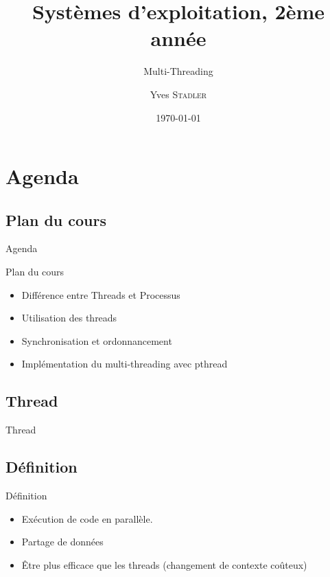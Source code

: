 
\title{Systèmes d'exploitation, 2ème année}
\subtitle{Multi-Threading}

\author{Yves \textsc{Stadler}}

\date{\today}



\begin{frame}
\titlepage
\end{frame}

\def\sectitle{Agenda}
\section{\sectitle}
\def\subsectitle{Plan du cours}
\subsection{\subsectitle}
\begin{frame}{\sectitle}
    \begin{block}{\subsectitle}
        \begin{itemize}
            \item Différence entre Threads et Processus
            \item Utilisation des threads
            \item Synchronisation et ordonnancement
            \item Implémentation du multi-threading avec pthread
        \end{itemize}
    \end{block}
\end{frame}


\def\sectitle{Thread}
\subsection{\sectitle}
\begin{frame}{\sectitle}
    \def\subsectitle{Définition}
    \subsection{\subsectitle}
    \begin{exampleblock}{\subsectitle}
        \begin{itemize}
            \item Exécution de code en parallèle.
            \item Partage de données
            \item Être plus efficace que les threads (changement de contexte
                coûteux)
        \end{itemize}
    \end{exampleblock}
\end{frame}

